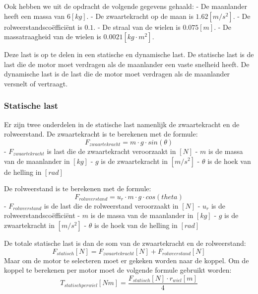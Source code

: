 \documentclass{article}
\begin{document}
    Ook hebben we uit de opdracht de volgende gegevens gehaald:\newline
    - De maanlander heeft een massa van $6[kg]$. \newline
    - De zwaartekracht op de maan is $1.62[m/s^2]$. \newline
    - De rolweerstandscoëfficiënt is $0.1$. \newline
    - De straal van de wielen is $0.075[m]$. \newline
    - De massatraagheid van de wielen is $0.0021[kg \cdot m^2]$. \newline

    Deze last is op te delen in een statische en dynamische last.
    De statische last is de last die de motor moet verdragen als de maanlander een vaste snelheid heeft.
    De dynamische last is de last die de motor moet verdragen als de maanlander versnelt of vertraagt.

\subsubsection{Statische last}
    Er zijn twee onderdelen in de statische last namenlijk de zwaartekracht en de rolweerstand.
    De zwaartekracht is te berekenen met de formule:
    $$F_{zwaartekracht} = m \cdot g \cdot sin(\theta)$$
    - $F_{zwaartekracht}$ is last die de zwaartekracht veroorzaakt in $[N]$ \newline
    - $m$ is de massa van de maanlander in $[kg]$ \newline
    - $g$ is de zwaartekracht in $[m/s^2]$ \newline
    - $\theta$ is de hoek van de helling in $[rad]$ \newline \newline

    De rolweerstand is te berekenen met de formule:
    $$F_{rolweerstand} =  u_{r} \cdot m \cdot g \cdot cos(theta) $$
    - $F_{rolweerstand}$ is de last die de rolweerstand veroorzaakt in $[N]$ \newline
    - $u_{r}$ is de rolweerstandscoëfficiënt \newline
    - $m$ is de massa van de maanlander in $[kg]$ \newline
    - $g$ is de zwaartekracht in $[m/s^2]$ \newline
    - $\theta$ is de hoek van de helling in $[rad]$ \newline \newline

    De totale statische last is dan de som van de zwaartekracht en de rolweerstand:
    $$F_{statisch}[N] = F_{zwaartekracht}[N] + F_{rolweerstand}[N]$$
    Maar om de motor te selecteren moet er gekeken worden naar de koppel. 
    Om de koppel te berekenen per motor moet de volgende formule gebruikt worden:
    $$T_{statisch per wiel}[Nm] = \frac{F_{statisch}[N] \cdot r_{wiel}[m]}{4} $$
\end{document}
